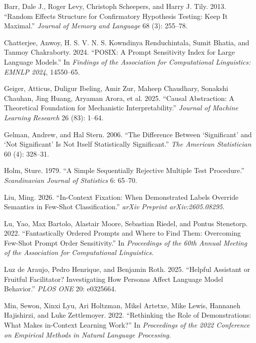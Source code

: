 \documentclass[
  11pt]{article}
\newlength{\cslhangindent}
\newenvironment{CSLReferences}[2] %
 {\begin{list}{}{%
  \setlength{\itemindent}{0pt}
  \setlength{\leftmargin}{0pt}
  \setlength{\parsep}{0pt}
  \ifodd #1
   \setlength{\leftmargin}{\cslhangindent}
   \setlength{\itemindent}{-1\cslhangindent}
  \fi
  \setlength{\itemsep}{#2\baselineskip}}}
 {\end{list}}
\begin{document}
\label{refs}
\begin{CSLReferences}{1}{0}
Barr, Dale J., Roger Levy, Christoph Scheepers, and Harry J. Tily. 2013.
{``Random Effects Structure for Confirmatory Hypothesis Testing: Keep It
Maximal.''} \emph{Journal of Memory and Language} 68 (3): 255--78.

Chatterjee, Anwoy, H. S. V. N. S. Kowndinya Renduchintala, Sumit Bhatia,
and Tanmoy Chakraborty. 2024. {``POSIX: A Prompt Sensitivity Index for
Large Language Models.''} In \emph{Findings of the Association for
Computational Linguistics: EMNLP 2024}, 14550--65.

Geiger, Atticus, Duligur Ibeling, Amir Zur, Maheep Chaudhary, Sonakshi
Chauhan, Jing Huang, Aryaman Arora, et al. 2025. {``Causal Abstraction:
A Theoretical Foundation for Mechanistic Interpretability.''}
\emph{Journal of Machine Learning Research} 26 (83): 1--64.

Gelman, Andrew, and Hal Stern. 2006. {``The Difference Between
{`Significant'} and {`Not Significant'} Is Not Itself Statistically
Significant.''} \emph{The American Statistician} 60 (4): 328--31.

Holm, Sture. 1979. {``A Simple Sequentially Rejective Multiple Test
Procedure.''} \emph{Scandinavian Journal of Statistics} 6: 65--70.

Liu, Ming. 2026. {``In-Context Fixation: When Demonstrated Labels
Override Semantics in Few-Shot Classification.''} \emph{arXiv Preprint
arXiv:2605.08295}.

Lu, Yao, Max Bartolo, Alastair Moore, Sebastian Riedel, and Pontus
Stenetorp. 2022. {``Fantastically Ordered Prompts and Where to Find
Them: Overcoming Few-Shot Prompt Order Sensitivity.''} In
\emph{Proceedings of the 60th Annual Meeting of the Association for
Computational Linguistics}.

Luz de Araujo, Pedro Henrique, and Benjamin Roth. 2025. {``Helpful
Assistant or Fruitful Facilitator? Investigating How Personas Affect
Language Model Behavior.''} \emph{PLOS ONE} 20: e0325664.

Min, Sewon, Xinxi Lyu, Ari Holtzman, Mikel Artetxe, Mike Lewis, Hannaneh
Hajishirzi, and Luke Zettlemoyer. 2022. {``Rethinking the Role of
Demonstrations: What Makes in-Context Learning Work?''} In
\emph{Proceedings of the 2022 Conference on Empirical Methods in Natural
Language Processing}.


\end{CSLReferences}
\end{document}
